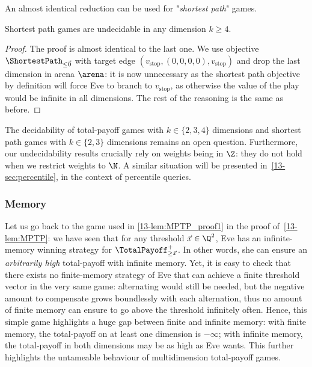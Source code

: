 An almost identical reduction can be used for "\textit{shortest path}" games.

\begin{theorem}
\label{13-thm:SPundec}
Shortest path games are undecidable in any dimension $k \geq 4$.
\end{theorem}

\begin{proof}
The proof is almost identical to the last one. We use objective $\ShortestPath_{\leq \vec{0}}$ with target edge $(v_{\text{stop}}, (0, 0, 0, 0), v_{\text{stop}})$ and drop the last dimension in arena $\arena$: it is now unnecessary as the shortest path objective by definition will force Eve to branch to $v_{\text{stop}}$, as otherwise the value of the play would be infinite in all dimensions. The rest of the reasoning is the same as before.
\end{proof}

\begin{remark}
The decidability of total-payoff games with $k \in \{2, 3, 4\}$ dimensions and shortest path games with $k \in \{2, 3\}$ dimensions remains an open question. Furthermore, our undecidability results crucially rely on weights being in $\Z$: they do not hold when we restrict weights to $\N$. A similar situation will be presented in~\cref{13-sec:percentile}, in the context of percentile queries.
\end{remark}

\subsubsection*{Memory} Let us go back to the game used in \cref{13-lem:MPTP_proof1} in the proof of~\cref{13-lem:MPTP}: we have seen that for any threshold $\vec{x} \in \Q^{2}$, Eve has an infinite-memory winning strategy for $\TotalPayoff^{+}_{\geq \vec{x}}$. In other words, she can ensure an \textit{arbitrarily high} total-payoff with infinite memory. Yet, it is easy to check that there exists no finite-memory strategy of Eve that can achieve a finite threshold vector in the very same game: alternating would still be needed, but the negative amount to compensate grows boundlessly with each alternation, thus no amount of finite memory can ensure to go above the threshold infinitely often. Hence, this simple game highlights a huge gap between finite and infinite memory: with finite memory, the total-payoff on at least one dimension is $-\infty$; with infinite memory, the total-payoff in both dimensions may be as high as Eve wants. This further highlights the untameable behaviour of multidimension total-payoff games.

